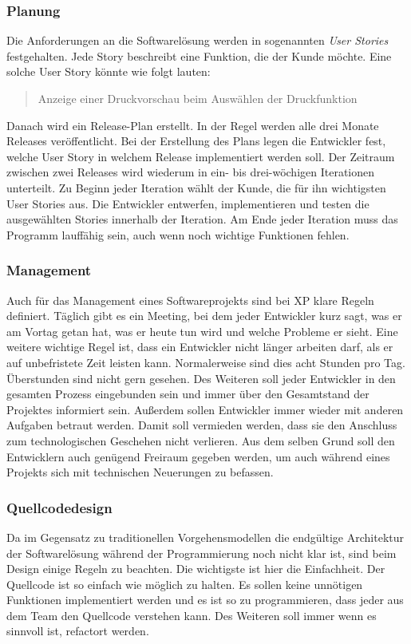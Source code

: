 \subsubsection{Planung}
Die Anforderungen an die Softwarelösung werden in sogenannten \emph{User Stories} festgehalten. Jede Story beschreibt eine Funktion, die der Kunde möchte. Eine solche User Story könnte wie folgt lauten:
\begin{quote}
Anzeige einer Druckvorschau beim Auswählen der Druckfunktion
\end{quote}
Danach wird ein Release-Plan erstellt. In der Regel werden alle drei Monate Releases veröffentlicht. Bei der Erstellung des Plans legen die Entwickler fest, welche User Story in welchem Release implementiert werden soll. Der Zeitraum zwischen zwei Releases wird wiederum in ein- bis drei-wöchigen Iterationen unterteilt. Zu Beginn jeder Iteration wählt der Kunde, die für ihn wichtigsten User Stories aus. Die Entwickler entwerfen, implementieren und testen die ausgewählten Stories innerhalb der Iteration. Am Ende jeder Iteration muss das Programm lauffähig sein, auch wenn noch wichtige Funktionen fehlen. 

\subsubsection{Management}
Auch für das Management eines Softwareprojekts sind bei XP klare Regeln definiert. Täglich gibt es ein Meeting, bei dem jeder Entwickler kurz sagt, was er am Vortag getan hat, was er heute tun wird und welche Probleme er sieht. Eine weitere wichtige Regel ist, dass ein Entwickler nicht länger arbeiten darf, als er auf unbefristete Zeit leisten kann. Normalerweise sind dies acht Stunden pro Tag. Überstunden sind nicht gern gesehen. Des Weiteren soll jeder Entwickler in den gesamten Prozess eingebunden sein und immer über den Gesamtstand der Projektes informiert sein. Außerdem sollen Entwickler immer wieder mit anderen Aufgaben betraut werden. Damit soll vermieden werden, dass sie den Anschluss zum technologischen Geschehen nicht verlieren. Aus dem selben Grund soll den Entwicklern auch genügend Freiraum gegeben werden, um auch während eines Projekts sich mit technischen Neuerungen zu befassen.

\subsubsection{Quellcodedesign}
Da im Gegensatz zu traditionellen Vorgehensmodellen die endgültige Architektur der Softwarelösung während der Programmierung noch nicht klar ist, sind beim Design einige Regeln zu beachten. Die wichtigste ist hier die Einfachheit. Der Quellcode ist so einfach wie möglich zu halten. Es sollen keine unnötigen Funktionen implementiert werden und es ist so zu programmieren, dass jeder aus dem Team den Quellcode verstehen kann. Des Weiteren soll immer wenn es sinnvoll ist, refactort werden.

